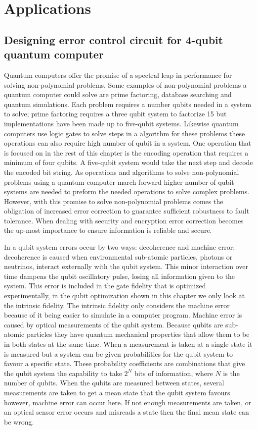 \chapter{Applications}
\section{Designing error control circuit for 4-qubit quantum computer}
\label{qubit}

Quantum computers offer the promise of a spectral leap in performance for solving non-polynomial problems. Some examples of non-polynomial problems a quantum computer could solve are prime factoring, database searching and quantum simulations. Each problem requires a number qubits needed in a system to solve; prime factoring requires a three qubit system to factorize 15 but implementations have been made up to five-qubit systems\cite{Lucero}. Likewise quantum computers use logic gates to
solve steps in a
algorithm for these problems these operations can also require high number of qubit in a system. One operation that is focused on in the rest of this chapter is the encoding operation that requires a minimum of four qubits. A five-qubit system would take the next step and decode the encoded bit string. As operations and algorithms to solve non-polynomial problems using a quantum computer march forward higher number of qubit systems are needed to preform the needed operations to solve complex problems. However, with
this promise to solve non-polynomial problems comes the obligation of increased error correction to guarantee sufficient robustness to fault tolerance. When dealing with security and encryption error correction becomes the up-most importance to ensure information is reliable and secure.

In a qubit system errors occur by two ways: decoherence and machine error; decoherence is caused when environmental sub-atomic particles, photons or neutrinos, interact externally with the qubit system. This minor interaction over time dampens the qubit oscillatory pulse, losing all information given to the system. This error is included in the gate fidelity that is optimized experimentally, in the qubit optimization shown in this chapter we only look at the intrinsic fidelity. The intrinsic
fidelity only considers the
machine error because of it being easier to simulate in a computer program. Machine error is caused by optical measurements of the qubit system. Because qubits are sub-atomic particles they have quantum mechanical properties that allow them to be in both states at the same time. When a measurement is taken at a single state it is measured but a system can be given probabilities for the qubit system to favour a specific state. These probability coefficients are combinations that give the
qubit system the capability to take $2^N$ bits of information, where $N$ is the number of qubits. When the qubits are measured between states, several measurements are taken to get a mean state that the qubit system favours however, machine error can occur here. If not enough measurements are taken, or an optical sensor error occurs and misreads a state then the final mean state can be wrong. 


